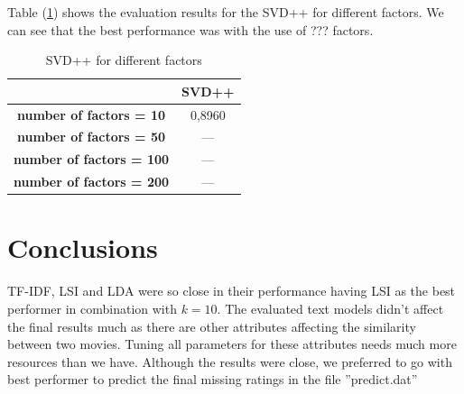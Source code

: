 \documentclass{sigish}
\begin{document}
Table (\ref{tab:svd_02}) shows the evaluation results for the SVD++ for different factors. We can see that the best performance was with the use of ??? factors.

\begin{table}[]
\centering
\begin{tabular}{|c|c|}
\hline
                     & \textbf{SVD++} \\ \hline
\textbf{number of factors = 10} & 0,8960        \\ \hline
\textbf{number of factors  = 50} & ---        \\ \hline
\textbf{number of factors  = 100} & ---        \\ \hline
\textbf{number of factors  = 200} & ---        \\ \hline

\end{tabular}
\caption{SVD++ for different factors}
\label{tab:svd_02}
\end{table}

\section{Conclusions}

TF-IDF, LSI and LDA were so close in their performance having LSI as the best performer in combination with $ k = 10 $. The evaluated text models didn't affect the final results much as there are other attributes affecting the similarity between two movies. Tuning all parameters for these attributes needs much more resources than we have. Although the results were close, we preferred to go with best performer to predict the final missing ratings in the file ''predict.dat''



\end{document}
